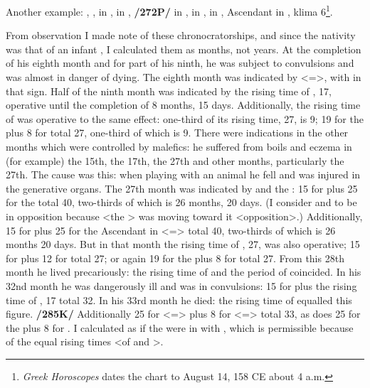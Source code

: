 Another example: \Sun, \Mercury, \Venus\xspace in \Leo, \Moon\xspace in \Virgo, \Saturn\xspace \textbf{/272P/} in \Libra, \Jupiter\xspace in \Capricorn, \Mars\xspace in \Aries, Ascendant in \Cancer, klima 6\footnote{\textit{Greek Horoscopes} dates the chart to August 14, 158 CE about 4 a.m.}.

From observation I made note of these chronocratorships, and since the nativity was that of an infant \mndl, I calculated them as months, not years. At the completion of his eighth month and for part of his ninth, he was subject to convulsions and was almost in danger of dying. The eighth month was indicated by \Libra\xspace <=\Venus>, with \Saturn\xspace in that sign. Half of the ninth month was indicated by the rising time of \Aries, 17, operative until the completion of 8 months, 15 days. Additionally, the rising time of \Capricorn\xspace was operative to the same effect: one-third of its rising time, 27, is 9; 19 for the \Sun\xspace plus 8 for \Venus\xspace total 27, one-third of which is 9. There were indications in the other months which were controlled by malefics: he suffered from boils and eczema in (for example) the 15th, the 17th, the 27th and other months, particularly the 27th. The cause was this: when playing with
an animal he fell and was injured in the generative organs. The 27th month was indicated by \Mars\xspace and the \Moon: 15 for \Mars\xspace plus 25 for the \Moon\xspace total 40, two-thirds of which is 26 months, 20 days. (I consider \Aries\xspace and \Virgo\xspace to be in opposition because <the \Moon> was moving toward it <opposition>.) Additionally, 15 for \Mars\xspace plus 25 for the Ascendant in \Cancer\xspace <=\Moon> total 40, two-thirds of which is 26 months 20 days. But in that month the rising time of \Capricorn, 27, was also operative; 15 for \Mars\xspace plus 12 for \Jupiter\xspace total 27; or again 19 for the \Sun\xspace plus 8 for \Venus\xspace total 27. From this 28th month he lived precariously: the rising time of \Libra\xspace and the period of \Saturn\xspace coincided. In his 32nd month he was dangerously ill and was in convulsions: 15 for \Mars\xspace plus the rising time of \Aries, 17 total 32. In his 33rd month he died: the rising time of \Cancer\xspace equalled this figure. \textbf{/285K/} Additionally 25 for \Cancer\xspace <=\Moon> plus 8 for \Libra\xspace <=\Venus> total 33, as does 25 for the \Moon\xspace plus 8 for \Libra. I calculated as if the \Moon\xspace were in \Libra\xspace with \Saturn, which is permissible because of the equal rising times <of \Virgo\xspace and \Libra>.

